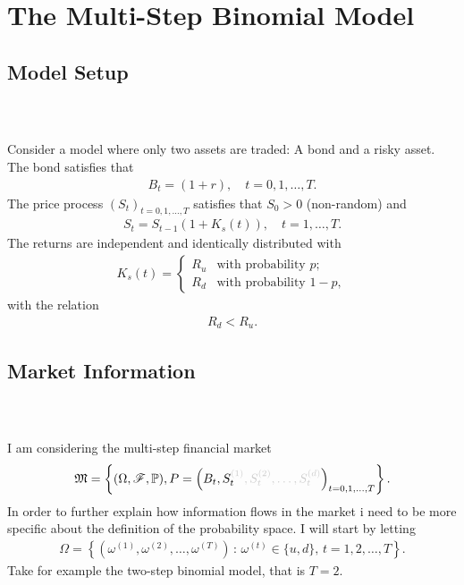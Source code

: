 \documentclass{beamer}
\numberwithin{equation}{section}
\begin{document}
\section{The Multi-Step Binomial Model}

\subsection{Model Setup}
\begin{frame}\frametitle{{\normalsize \secname} \\ {\large \subsecname}}
    Consider a model where only two assets are traded: A bond and a risky asset.
    The bond satisfies that
    \begin{align}
        B_t = (1+r), \quad t = 0,1, \ldots, T.
    \end{align}
    The price process $(S_t)_{t = 0,1, \ldots, T}$ satisfies that $S_0 > 0$ (non-random) and
    \begin{align}
        S_t = S_{t - 1} (1 + K_s(t)), \quad t = 1, \ldots, T.
    \end{align}
    The returns are independent and identically distributed with
    \begin{align}
        K_s(t) =
        \begin{cases}
            R_u &\text{with probability } p; \\
            R_d &\text{with probability } 1-p,
        \end{cases}
    \end{align}
    with the relation
    \begin{align}
        R_d < R_u.
    \end{align}
\end{frame}

\subsection{Market Information}

\begin{frame}\frametitle{{\normalsize \secname} \\ {\large \subsecname}}
    I am considering the multi-step financial market
    \begin{align}
        \mathfrak{M} = \left\{
            (\Omega, \mathscr{F}, \mathbb{P}),
            P = \left(
                B_t, S_t^{{\color{black!20!white}(1)}}{\color{black!20!white}, S_t^{(2)}, \ldots, S_t^{(d)}}
            \right)_{t = 0,1, \ldots, T}
        \right\}.
    \end{align}
    In order to further explain how information flows in the market i need to be more specific about the definition of the probability space.
    I will start by letting
    \begin{align}
        \Omega = \left\{
            \left(
                \omega^{(1)}, \omega^{(2)}, \ldots, \omega^{(T)}
            \right)
            \, : \,
            \omega^{(t)} \in \{u,d\}, \, t = 1, 2, \ldots, T
        \right\}.
    \end{align}
    Take for example the two-step binomial model, that is $T = 2$.
\end{frame}
\end{document}
